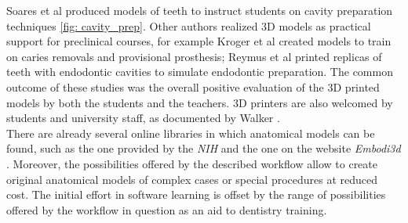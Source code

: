 Soares et al \parencite{Reference71} produced models of teeth to instruct students on cavity preparation techniques \ref{fig: cavity_prep}. Other authors realized 3D models as practical support for preclinical courses, for example Kroger et al \parencite{Reference72} created models to train on caries removals and provisional prosthesis; Reymus et al \parencite{Reference73} printed replicas of teeth with endodontic cavities to simulate endodontic preparation. The common outcome of these studies was the overall positive evaluation of the 3D printed models by both the students and the teachers. 3D printers are also welcomed by students and university staff, as documented by Walker \parencite{Reference74}. \\
There are already several online libraries in which anatomical models can be found, such as the one provided by the \emph{NIH} \parencite{Reference75} and the one on the website \emph{Embodi3d} \parencite{Reference76}. Moreover, the possibilities offered by the described workflow allow to create original anatomical models of complex cases or special procedures at reduced cost. The initial effort in software learning is offset by the range of possibilities offered by the workflow in question as an aid to dentistry training.

